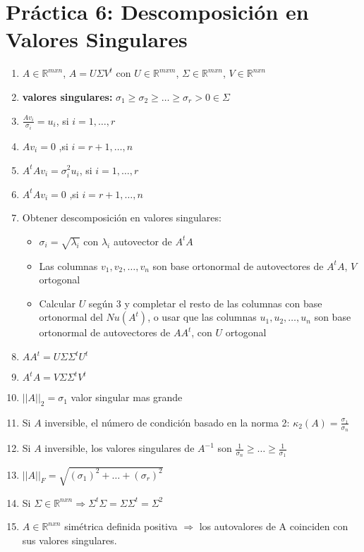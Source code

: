 \documentclass[10pt]{article}
\begin{document}
\section*{Práctica 6: Descomposición en Valores Singulares}
\begin{enumerate}
    \item $A \in \mathbb{R}^{mxn}$, $A=U\Sigma V^t$ con  $U \in \mathbb{R}^{mxm}$, $\Sigma \in \mathbb{R}^{mxn}$, $V\in \mathbb{R}^{nxn}$
    \item \textbf{valores singulares: }$\sigma_1 \geq \sigma_2 \geq \dots \geq \sigma_r > 0 \in \Sigma$
    \item $\frac{Av_i}{\sigma_i} = u_i$, si $i = 1, \dots, r$
    \item $Av_i = 0$ ,si $i = r+1, \dots, n$
    \item $A^tAv_i = \sigma_i^2 u_i$, si $i = 1, \dots, r$
    \item $A^tAv_i = 0$ ,si $i = r+1, \dots, n$
    \item Obtener descomposición en valores singulares:
    \begin{itemize}
        \item $\sigma_i = \sqrt{\lambda_i}$ con $\lambda_i$ autovector de $A^tA$ 
        \item Las columnas $v_1, v_2, \dots, v_n$ son base ortonormal de autovectores de $A^tA$, $V$ ortogonal
        \item Calcular $U$ según 3 y completar el resto de las columnas con base ortonormal del $Nu(A^t)$, o usar que las columnas $u_1, u_2, \dots, u_n$ son base ortonormal de autovectores de $AA^t$, con $U$ ortogonal
    \end{itemize}
    \item $AA^t = U \Sigma \Sigma^t U^t$
    \item $A^tA = V \Sigma \Sigma^t V^t$
    \item $||A||_2 = \sigma_1$ valor singular mas grande
    \item Si $A$ inversible, el número de condición basado en la norma 2: $\kappa_2(A) = \frac{\sigma_1}{\sigma_n}$
    \item Si $A$ inversible, los valores singulares de $A^{-1}$ son $\frac{1}{\sigma_n} \geq \dots \geq \frac{1}{\sigma_1} $
    \item $||A||_F = \sqrt{(\sigma_1)^2 + \dots + (\sigma_r)^2}$
    \item Si $\Sigma \in \mathbb{R}^{nxn} \Rightarrow \Sigma^t \Sigma = \Sigma \Sigma^t = \Sigma^2$ 
    \item $A \in \mathbb{R}^{nxn}$ simétrica definida positiva $\Rightarrow$ los autovalores de A coinciden con sus valores singulares. 
\end{enumerate}
\end{document}
